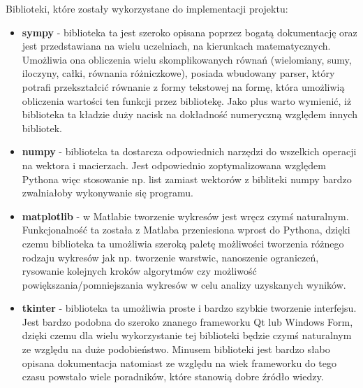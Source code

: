 \documentclass[a4paper,12pt]{article}
\begin{document}
\begin{flushleft}
    Biblioteki, które zostały wykorzystane do implementacji projektu:
\end{flushleft}

\begin{itemize}
    \item \textbf{sympy} - biblioteka ta jest szeroko opisana poprzez bogatą dokumentację oraz jest przedstawiana na wielu uczelniach, na kierunkach matematycznych. Umożliwia ona obliczenia wielu skomplikowanych równań (wielomiany, sumy, iloczyny, całki, równania różniczkowe), posiada wbudowany parser, który potrafi przekształcić równanie z formy tekstowej na formę, która umożliwią obliczenia wartości ten funkcji przez bibliotekę. Jako plus warto wymienić, iż biblioteka ta kładzie duży nacisk na dokładność numeryczną względem innych bibliotek.
    \item \textbf{numpy} - biblioteka ta dostarcza odpowiednich narzędzi do wszelkich operacji na wektora i macierzach. Jest odpowiednio zoptymalizowana względem Pythona więc stosowanie np. list zamiast wektorów z bibliteki numpy bardzo zwalniałoby wykonywanie się programu.
    \item \textbf{matplotlib} - w Matlabie tworzenie wykresów jest wręcz czymś naturalnym. Funkcjonalność ta została z Matlaba przeniesiona wprost do Pythona, dzięki czemu biblioteka ta umożliwia szeroką paletę możliwości tworzenia różnego rodzaju wykresów jak np. tworzenie warstwic, nanoszenie ograniczeń, rysowanie kolejnych kroków algorytmów czy możliwość powiększania/pomniejszania wykresów w celu analizy uzyskanych wyników.
    \item \textbf{tkinter} - biblioteka ta umożliwia proste i bardzo szybkie tworzenie interfejsu. Jest bardzo podobna do szeroko znanego frameworku Qt lub Windows Form, dzięki czemu dla wielu wykorzystanie tej biblioteki będzie czymś naturalnym ze względu na duże podobieństwo. Minusem biblioteki jest bardzo słabo opisana dokumentacja natomiast ze względu na wiek frameworku do tego czasu powstało wiele poradników, które stanowią dobre źródło wiedzy.
\end{itemize}
\end{document}
